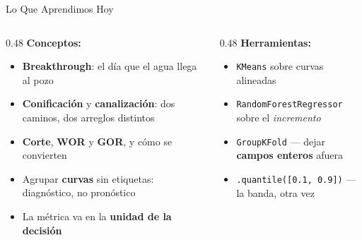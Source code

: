 \documentclass[aspectratio=169, 11pt]{beamer}
\begin{document}
\begin{frame}[shrink=8]{Lo Que Aprendimos Hoy}
  \vspace{-2pt}
  \begin{columns}[T]
    \begin{column}{0.48\textwidth}
      {\small\color{arcaDark}\bfseries\faLightbulb[regular]\hspace{5pt}Conceptos:}
      \vspace{4pt}
      {\footnotesize\color{textMuted}
      \begin{itemize}\setlength{\itemsep}{3pt}
        \item[{\color{codeGreen}\scriptsize\faCheck}]
          \textbf{Breakthrough}: el día que el agua llega al pozo
        \item[{\color{codeGreen}\scriptsize\faCheck}]
          \textbf{Conificación} y \textbf{canalización}: dos caminos, dos
          arreglos distintos
        \item[{\color{codeGreen}\scriptsize\faCheck}]
          \textbf{Corte}, \textbf{WOR} y \textbf{GOR}, y cómo se convierten
        \item[{\color{codeGreen}\scriptsize\faCheck}]
          Agrupar \textbf{curvas} sin etiquetas: diagnóstico, no pronóstico
        \item[{\color{codeGreen}\scriptsize\faCheck}]
          La métrica va en la \textbf{unidad de la decisión}
      \end{itemize}}
    \end{column}
    \begin{column}{0.48\textwidth}
      {\small\color{arcaDark}\bfseries\faTools\hspace{5pt}Herramientas:}
      \vspace{4pt}
      {\footnotesize\color{textMuted}
      \begin{itemize}\setlength{\itemsep}{3pt}
        \item[{\color{arcaRed}\scriptsize\faArrowRight}]
          \texttt{KMeans} sobre curvas alineadas
        \item[{\color{arcaRed}\scriptsize\faArrowRight}]
          \texttt{RandomForestRegressor} sobre el \emph{incremento}
        \item[{\color{arcaRed}\scriptsize\faArrowRight}]
          \texttt{GroupKFold} --- dejar \textbf{campos enteros} afuera
        \item[{\color{arcaRed}\scriptsize\faArrowRight}]
          \texttt{.quantile([0.1, 0.9])} --- la banda, otra vez
      \end{itemize}}

\end{column}
\end{columns}
\end{frame}
\end{document}
